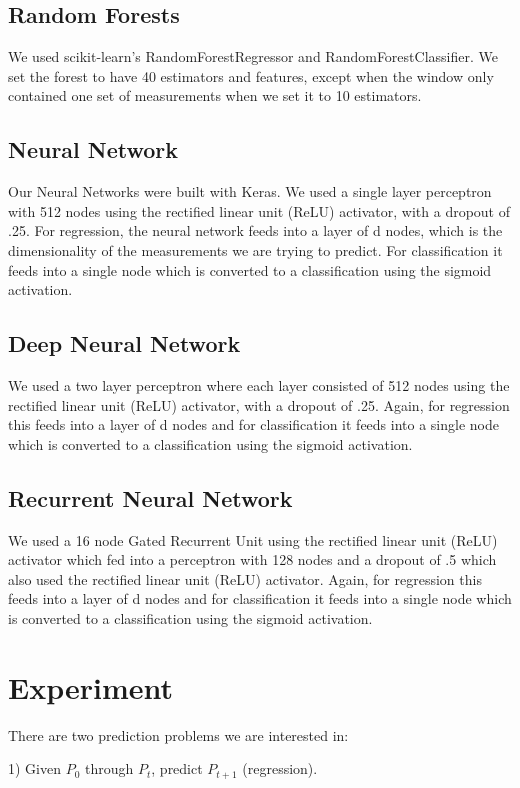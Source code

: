 \documentclass[12pt,a4paper]{article}
\begin{document}
\subsection{Random Forests}
We used scikit-learn's RandomForestRegressor and RandomForestClassifier.  We set the forest to have 40 estimators and features, except when the window only contained one set of measurements when we set it to 10 estimators.  

\subsection{Neural Network}
Our Neural Networks were built with Keras.  We used a single layer perceptron with 512 nodes using the rectified linear unit (ReLU) activator, with a dropout of .25.  For regression, the neural network feeds into a layer of d nodes, which is the dimensionality of the measurements we are trying to predict.  For classification it feeds into a single node which is converted to a classification using the sigmoid activation.  

\subsection{Deep Neural Network}
We used a two layer perceptron where each layer consisted of 512 nodes using the rectified linear unit (ReLU) activator, with a dropout of .25.  Again, for regression this feeds into a layer of d nodes and for classification it feeds into a single node which is converted to a classification using the sigmoid activation.  

\subsection{Recurrent Neural Network}
We used a 16 node Gated Recurrent Unit using the rectified linear unit (ReLU) activator which fed into a perceptron with 128 nodes and a dropout of .5 which also used the rectified linear unit (ReLU) activator.  Again, for regression this feeds into a layer of d nodes and for classification it feeds into a single node which is converted to a classification using the sigmoid activation.  

\section{Experiment}
There are two prediction problems we are interested in: 

1) Given $P_0$ through $P_t$, predict $P_{t+1}$ (regression). 
\end{document}
